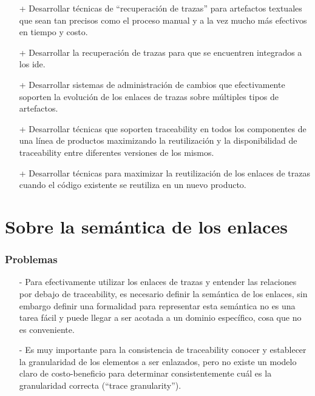 \documentclass[a4paper,12pt,oneside,spanish]{book}
\begin{document}
\begin{itemize}

\item[+] Desarrollar técnicas de “recuperación de trazas” para artefactos textuales que sean tan precisos como el proceso manual y a la vez mucho más efectivos en tiempo y costo.

\item[+] Desarrollar la recuperación de trazas para que se encuentren integrados a los \gls{ide}.

\item[+] Desarrollar sistemas de administración de cambios que efectivamente soporten la evolución de los enlaces de trazas sobre múltiples tipos de artefactos.

\item[+] Desarrollar técnicas que soporten traceability en todos los componentes de una línea de productos maximizando la reutilización y la disponibilidad de traceability entre diferentes versiones de los mismos.

\item[+] Desarrollar técnicas para maximizar la reutilización de los enlaces de trazas cuando el código existente se reutiliza en un nuevo producto.

\end{itemize}

\section{Sobre la semántica de los enlaces}

\subsubsection{Problemas}

\begin{itemize}

\item[-] Para efectivamente utilizar los enlaces de trazas y entender las relaciones por debajo de traceability, es necesario definir la semántica de los enlaces, sin embargo definir una formalidad para representar esta semántica no es una tarea fácil y puede llegar a ser acotada a un dominio específico, cosa que no es conveniente.

\item[-] Es muy importante para la consistencia de traceability conocer y establecer la granularidad de los elementos a ser enlazados, pero no existe un modelo claro de costo-beneficio para determinar consistentemente cuál es la granularidad correcta (“trace granularity”).

\end{itemize}
\end{document}
